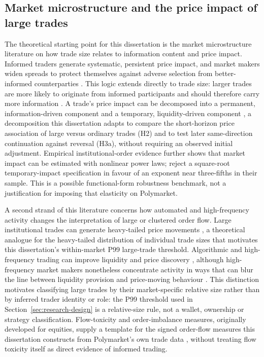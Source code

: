 \subsection{Market microstructure and the price impact of large trades}
\label{lr:microstructure}

The theoretical starting point for this dissertation is the market microstructure literature on how trade size relates to information content and price impact. Informed traders generate systematic, persistent price impact, and market makers widen spreads to protect themselves against adverse selection from better-informed counterparties \citep{kyle1985continuous,glostenmilgrom1985bidask}. This logic extends directly to trade size: larger trades are more likely to originate from informed participants and should therefore carry more information \citep{easleyohara1987tradesize}. A trade's price impact can be decomposed into a permanent, information-driven component and a temporary, liquidity-driven component \citep{hasbrouck1991information,madhavan1997prices}, a decomposition this dissertation adapts to compare the short-horizon price association of large versus ordinary trades (H2) and to test later same-direction continuation against reversal (H3a), without requiring an observed initial adjustment. Empirical institutional-order evidence further shows that market impact can be estimated with nonlinear power laws; \citet{almgren2005direct} reject a square-root temporary-impact specification in favour of an exponent near three-fifths in their sample. This is a possible functional-form robustness benchmark, not a justification for imposing that elasticity on Polymarket.

A second strand of this literature concerns how automated and high-frequency activity changes the interpretation of large or clustered order flow. Large institutional trades can generate heavy-tailed price movements \citep{gabaix2006institutional}, a theoretical analogue for the heavy-tailed distribution of individual trade sizes that motivates this dissertation's within-market P99 large-trade threshold. Algorithmic and high-frequency trading can improve liquidity and price discovery \citep{hendershott2011algorithmic,brogaard2014hft}, although high-frequency market makers nonetheless concentrate activity in ways that can blur the line between liquidity provision and price-moving behaviour \citep{menkveld2013marketmakers}. This distinction motivates classifying large trades by their market-specific relative size rather than by inferred trader identity or role: the P99 threshold used in Section~\ref{sec:research-design} is a relative-size rule, not a wallet, ownership or strategy classification. Flow-toxicity and order-imbalance measures, originally developed for equities, supply a template for the signed order-flow measures this dissertation constructs from Polymarket's own trade data \citep{easley2012flowtoxicity,easley2016discerning}, without treating flow toxicity itself as direct evidence of informed trading.


